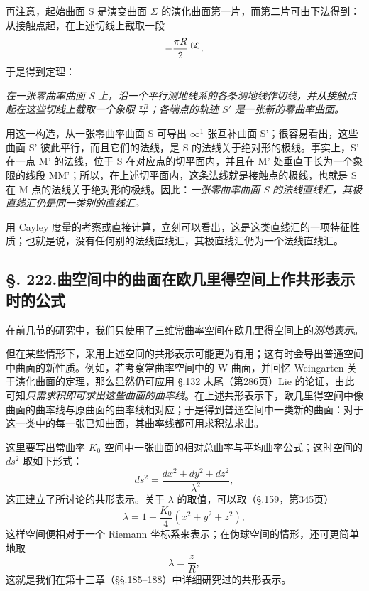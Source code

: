 再注意，起始曲面 S 是演变曲面 $\Sigma$ 的演化曲面第一片，而第二片可由下法得到：从接触点起，在上述切线上截取一段
\[
-\frac{\pi R}{2}\,\srcfnmark{2}.
\]
于是得到定理：

\emph{在一张零曲率曲面 S 上，沿一个平行测地线系的各条测地线作切线，并从接触点起在这些切线上截取一个象限 $\frac{\pi R}{2}$；各端点的轨迹 $S'$ 是一张新的零曲率曲面。}

用这一构造，从一张零曲率曲面 S 可导出 $\infty^1$ 张互补曲面 S'；很容易看出，这些曲面 S' 彼此平行，而且它们的法线，是 S 的法线关于绝对形的极线。事实上，S' 在一点 M' 的法线，位于 S 在对应点的切平面内，并且在 M' 处垂直于长为一个象限的线段 MM'；所以，在上述切平面内，这条法线就是接触点的极线，也就是 S 在 M 点的法线关于绝对形的极线。因此：\emph{一张零曲率曲面 S 的法线直线汇，其极直线汇仍是同一类别的直线汇。}

用 Cayley 度量的考察或直接计算，立刻可以看出，这是这类直线汇的一项特征性质；也就是说，没有任何别的法线直线汇，其极直线汇仍为一个法线直线汇。

\subsection*{\S. 222.\quad 曲空间中的曲面在欧几里得空间上作共形表示时的公式}

在前几节的研究中，我们只使用了三维常曲率空间在欧几里得空间上的\emph{测地表示}。

但在某些情形下，采用上述空间的共形表示可能更为有用；这有时会导出普通空间中曲面的新性质。例如，若考察常曲率空间中的 W 曲面，并回忆 Weingarten 关于演化曲面的定理，那么显然仍可应用 \S.132 末尾（第286页）Lie 的论证，由此可知\emph{只需求积即可求出这些曲面的曲率线}。在上述共形表示下，欧几里得空间中像曲面的曲率线与原曲面的曲率线相对应；于是得到普通空间中一类新的曲面：对于这一类中的每一张已知曲面，其曲率线都可用求积法求出。

这里要写出常曲率 $K_0$ 空间中一张曲面的相对总曲率与平均曲率公式；这时空间的 $ds^2$ 取如下形式：
\[
\tag{55}
ds^2=\frac{dx^2+dy^2+dz^2}{\lambda^2},
\]
这正建立了所讨论的共形表示。关于 $\lambda$ 的取值，可以取（\S.159，第345页）
\[
\tag{56}
\lambda=1+\frac{K_0}{4}(x^2+y^2+z^2),
\]
这样空间便相对于一个 Riemann 坐标系来表示；在伪球空间的情形，还可更简单地取
\[
\tag{56*}
\lambda=\frac zR,
\]
这就是我们在第十三章（\S\S.185--188）中详细研究过的共形表示。

